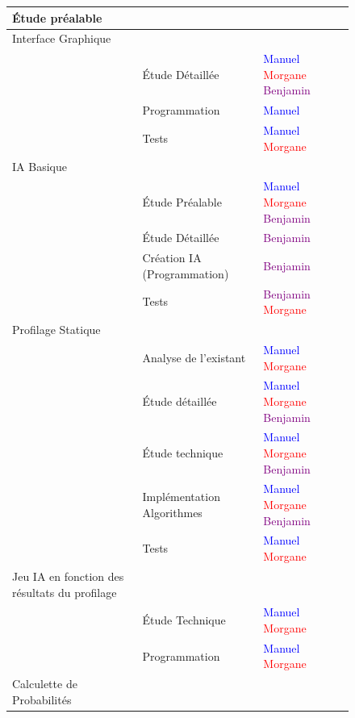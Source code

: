 \documentclass{report}
\begin{document}
		\begin{figure}[h]
			\hspace{-1.5cm}	\begin{tabular}{|l|l|l|}
				\hline
				Étude préalable & & \\
				\hline
  				 Interface Graphique & &  \\
  				 \hline
  				 & Étude Détaillée &  \textcolor{blue}{Manuel}  \textcolor{red}{Morgane}  \textcolor{purple}{Benjamin}\\
  				 \hline
  				 & Programmation & \textcolor{blue}{Manuel}\\
  				 \hline
  				 & Tests & \textcolor{blue}{Manuel}  \textcolor{red}{Morgane}\\
  				 \hline
  				 IA Basique & & \\
  				 \hline
  				 & Étude Préalable & \textcolor{blue}{Manuel}  \textcolor{red}{Morgane}  \textcolor{purple}{Benjamin}\\
  				 \hline
  				 & Étude Détaillée & \textcolor{purple}{Benjamin}\\
  				 \hline
  				 & Création IA (Programmation) & \textcolor{purple}{Benjamin}\\
  				 \hline
  				 & Tests & \textcolor{purple}{Benjamin} \textcolor{red}{Morgane}\\
  				 \hline
  				 Profilage Statique & &\\
  				 \hline
  				 & Analyse de l'existant & \textcolor{blue}{Manuel}  \textcolor{red}{Morgane} \\
  				 \hline
  				 & Étude détaillée & \textcolor{blue}{Manuel}  \textcolor{red}{Morgane}  \textcolor{purple}{Benjamin}\\
  				 \hline
  				 & Étude technique & \textcolor{blue}{Manuel}  \textcolor{red}{Morgane}  \textcolor{purple}{Benjamin}\\
  				 \hline
  				 & Implémentation Algorithmes & \textcolor{blue}{Manuel}  \textcolor{red}{Morgane}  \textcolor{purple}{Benjamin}\\
  				 \hline
  				 & Tests & \textcolor{blue}{Manuel}  \textcolor{red}{Morgane} \\
  				 \hline
  				 Jeu IA en fonction des résultats du profilage & &\\
  				 \hline
  				 & Étude Technique & \textcolor{blue}{Manuel}  \textcolor{red}{Morgane} \\
  				 \hline
  				 & Programmation & \textcolor{blue}{Manuel}  \textcolor{red}{Morgane} \\
  				 \hline
  				 Calculette de Probabilités & & \\

\end{tabular}
\end{figure}
\end{document}
